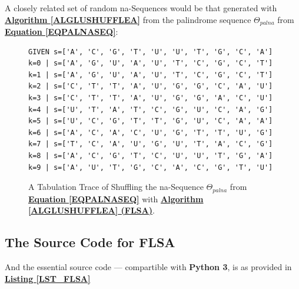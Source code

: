 \documentclass[a4paper, 18pt]{book} %
\begin{document}
A closely related set of random na-Sequences would be that generated with \textbf{\hyperref[ALGLUSHUFFLEA]{Algorithm \ref{ALGLUSHUFFLEA}}} from the palindrome sequence $\Theta_{palna}$ from \textbf{\hyperref[EQPALNASEQ]{Equation \ref{EQPALNASEQ}}}:


\begin{figure}[H]
  \begin{center}
\Large
\begin{verbatim}
GIVEN s=['A', 'C', 'G', 'T', 'U', 'U', 'T', 'G', 'C', 'A']
k=0 | s=['A', 'G', 'U', 'A', 'U', 'T', 'C', 'G', 'C', 'T']
k=1 | s=['A', 'G', 'U', 'A', 'U', 'T', 'C', 'G', 'C', 'T']
k=2 | s=['C', 'T', 'T', 'A', 'U', 'G', 'G', 'C', 'A', 'U']
k=3 | s=['C', 'T', 'T', 'A', 'U', 'G', 'G', 'A', 'C', 'U']
k=4 | s=['U', 'T', 'A', 'T', 'C', 'G', 'U', 'C', 'A', 'G']
k=5 | s=['U', 'C', 'G', 'T', 'T', 'G', 'U', 'C', 'A', 'A']
k=6 | s=['A', 'C', 'A', 'C', 'U', 'G', 'T', 'T', 'U', 'G']
k=7 | s=['T', 'C', 'A', 'U', 'G', 'U', 'T', 'A', 'C', 'G']
k=8 | s=['A', 'C', 'G', 'T', 'C', 'U', 'U', 'T', 'G', 'A']
k=9 | s=['A', 'U', 'T', 'G', 'C', 'A', 'C', 'G', 'T', 'U']
\end{verbatim}

   \caption{A Tabulation Trace of Shuffling the na-Sequence $\Theta_{palna}$ from \textbf{\hyperref[EQPALNASEQ]{Equation \ref{EQPALNASEQ}}} with \textbf{\hyperref[ALGLUSHUFFLEA]{Algorithm \ref{ALGLUSHUFFLEA} (FLSA)}}.}
  \label{FIGTRACEFLSAPALNA}
  \end{center}
\end{figure}

\subsection{The Source Code for FLSA}

And the essential source code --- compartible with \textbf{Python 3}, is as provided in \textbf{\hyperref[LST_FLSA]{Listing \ref{LST_FLSA}}}
\end{document}
